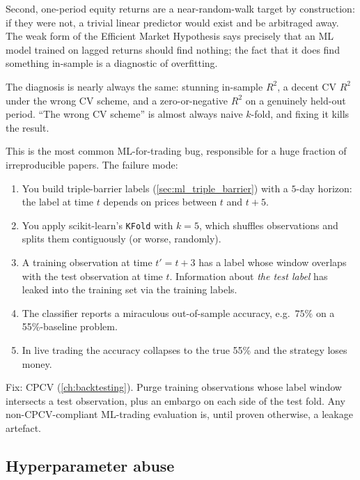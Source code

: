 Second, one-period equity returns are a near-random-walk target
by construction: if they were not, a trivial linear predictor
would exist and be arbitraged away. The weak form of the
Efficient Market Hypothesis says precisely that an ML model
trained on lagged returns should find nothing; the fact that it
does find something in-sample is a diagnostic of overfitting.

The diagnosis is nearly always the same: stunning in-sample
$R^2$, a decent CV $R^2$ under the wrong CV scheme, and a
zero-or-negative $R^2$ on a genuinely held-out period. ``The
wrong CV scheme'' is almost always naive $k$-fold, and fixing it
kills the result.

\begin{pitfallbox}
This is the most common ML-for-trading bug, responsible for a
huge fraction of irreproducible papers. The failure mode:

\begin{enumerate}
  \item You build triple-barrier labels
  (\cref{sec:ml_triple_barrier}) with a $5$-day horizon: the
  label at time $t$ depends on prices between $t$ and $t+5$.
  \item You apply scikit-learn's \texttt{KFold} with $k = 5$,
  which shuffles observations and splits them
  contiguously (or worse, randomly).
  \item A training observation at time $t' = t + 3$ has a label
  whose window overlaps with the test observation at time
  $t$. Information about \emph{the test label} has leaked
  into the training set via the training labels.
  \item The classifier reports a miraculous out-of-sample
  accuracy, e.g.\ $75\%$ on a 55\%-baseline problem.
  \item In live trading the accuracy collapses to the true
  55\% and the strategy loses money.
\end{enumerate}

Fix: CPCV (\cref{ch:backtesting}). Purge training observations
whose label window intersects a test observation, plus an embargo
on each side of the test fold. Any non-CPCV-compliant ML-trading
evaluation is, until proven otherwise, a leakage artefact.
\end{pitfallbox}

\subsection{Hyperparameter abuse}
\label{subsec:ml_hyper_abuse}

